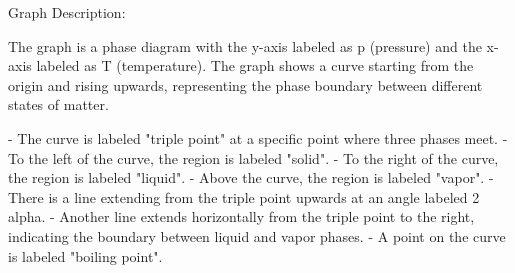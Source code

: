Graph Description:

The graph is a phase diagram with the y-axis labeled as p (pressure) and the x-axis labeled as T (temperature). The graph shows a curve starting from the origin and rising upwards, representing the phase boundary between different states of matter.

- The curve is labeled "triple point" at a specific point where three phases meet.
- To the left of the curve, the region is labeled "solid".
- To the right of the curve, the region is labeled "liquid".
- Above the curve, the region is labeled "vapor".
- There is a line extending from the triple point upwards at an angle labeled 2 alpha.
- Another line extends horizontally from the triple point to the right, indicating the boundary between liquid and vapor phases.
- A point on the curve is labeled "boiling point".